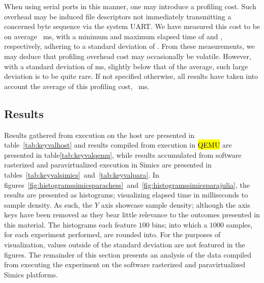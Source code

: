When using serial ports in this manner, one may introduce a profiling cost.
Such overhead may be induced file descriptors not immediately transmitting a concerned byte sequence via the system UART.
We have measured this cost to be on average ~ms, with a minimum and maximum elapsed time of  and , respectively, adhering to a standard deviation of .
From these measurements, we may deduce that profiling overhead cost may occasionally be volatile.
However, with a standard deviation of  ms, slightly below that of the average, such large deviation is to be quite rare.
If not specified otherwise, all results have taken into account the average of this profiling cost, ~ms.

\subsection{Results}
\label{sec:results}
Results gathered from execution on the host are presented in table~\ref{tab:keyvalhost} and results compiled from execution in \hl{QEMU} are presented in table\ref{tab:keyvalqemu}, while results accumulated from software rasterized and paravirtualized execution in Simics are presented in tables~\ref{tab:keyvalsimics}~and~\ref{tab:keyvalpara}.
In figures~\ref{fig:histogramssimicsparachess}~and~\ref{fig:histogramssimicsparajulia}, the results are presented as histograms; visualizing elapsed time in milliseconds to sample density.
As such, the $Y$ axis showcase sample density; although the axis keys have been removed as they bear little relevance to the outcomes presented in this material.
The histograms each feature $100$ bins; into which a $1000$ samples, for each experiment performed, are rounded into.
For the purposes of visualization, values outside of the standard deviation are not featured in the figures.
The remainder of this section presents an analysis of the data compiled from executing the experiment on the software rasterized and paravirtualized Simics platforms.

\providecommand{\chesskeyone}{$60\times60$ tiles}
\providecommand{\chesskeytwo}{$84\times84$ tiles}
\providecommand{\chesskeythree}{$118\times118$ tiles}

\providecommand{\juliakeyone}{$225$ iterations}
\providecommand{\juliakeytwo}{$450$ iterations}
\providecommand{\juliakeythree}{$900$ iterations}

